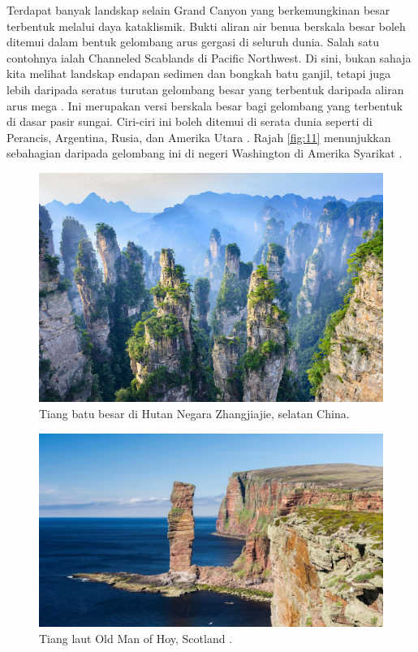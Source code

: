 \documentclass[10pt,twocolumn,letterpaper]{article}
\begin{document}
Terdapat banyak landskap selain Grand Canyon yang berkemungkinan besar terbentuk melalui daya kataklismik. Bukti aliran air benua berskala besar boleh ditemui dalam bentuk gelombang arus gergasi di seluruh dunia. Salah satu contohnya ialah Channeled Scablands di Pacific Northwest. Di sini, bukan sahaja kita melihat landskap endapan sedimen dan bongkah batu ganjil, tetapi juga lebih daripada seratus turutan gelombang besar yang terbentuk daripada aliran arus mega \cite{78,79}. Ini merupakan versi berskala besar bagi gelombang yang terbentuk di dasar pasir sungai. Ciri-ciri ini boleh ditemui di serata dunia seperti di Perancis, Argentina, Rusia, dan Amerika Utara \cite{81}. Rajah \ref{fig:11} menunjukkan sebahagian daripada gelombang ini di negeri Washington di Amerika Syarikat \cite{80}.

\begin{figure}[b]
\begin{center}
   \includegraphics[width=1\linewidth]{zhangjiajie.jpg}
\end{center}
   \caption{Tiang batu besar di Hutan Negara Zhangjiajie, selatan China.}
\label{fig:12}
\label{fig:onecol}
\end{figure}

\begin{figure}[b]
\begin{center}
   \includegraphics[width=1\linewidth]{hoy.jpg}
\end{center}
   \caption{Tiang laut Old Man of Hoy, Scotland \cite{83}.}
\label{fig:13}
\label{fig:onecol}
\end{figure}
\end{document}
